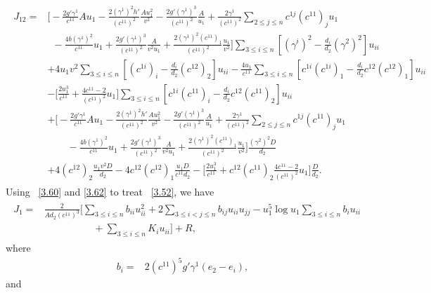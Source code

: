 \documentclass[11pt]{amsart}
\numberwithin{equation}{section}
\begin{document}
\begin{align}\label{3.62}
\begin{split}
J_{12}=&\big[-\frac{2g'\gamma^1}{c^{11}}Au_1-\frac{2(\gamma^1)^2h'}{(c^{11})^2}\frac{Au_1^2}{v^2}
-\frac{2g'(\gamma^1)^3}{(c^{11})^2}\frac{A}{u_1}
+\frac{2\gamma^1}{(c^{11})^2}\sum_{2\leq j\leq n}c^{1j}(c^{11})_ju_1\\&\,\,\,-\frac{4b(\gamma^1)^2}{c^{11}}u_1+\frac{2g'(\gamma^1)^3}{(c^{11})^2}\frac{A}{v^2u_1}
+\frac{2(\gamma^1)^2(c^{11})_1}{(c^{11})^2}\frac{u_1}{v^2}\big]\sum_{3\leq i\leq n}[(\gamma^i)^2-\frac{d_i}{d_2}(\gamma^2)^2]u_{ii}\\&+4u_1v^2\sum_{3\leq i\leq n}[(c^{1i})_{i}-\frac{d_i}{d_2}(c^{12})_{2}]u_{ii}-\frac{4u_1}{c^{11}}\sum_{3\leq i\leq n}[c^{1i}(c^{1i})_1-\frac{d_i}{d_2}c^{12}(c^{12})_1]u_{ii}\\&
-\big[\frac{2u_1^3}{c^{11}}+\frac{4c^{11}-2}{(c^{11})^2}u_1\big]\sum_{3\leq i\leq n}[c^{1i}(c^{11})_i-\frac{d_i}{d_2}c^{12}(c^{11})_2]u_{ii}\\
&+\big[-\frac{2g'\gamma^1}{c^{11}}Au_1-\frac{2(\gamma^1)^2h'}{(c^{11})^2}\frac{Au_1^2}{v^2}
-\frac{2g'(\gamma^1)^3}{(c^{11})^2}\frac{A}{u_1}
+\frac{2\gamma^1}{(c^{11})^2}\sum_{2\leq j\leq n}c^{1j}(c^{11})_ju_1\\&\qquad-\frac{4b(\gamma^1)^2}{c^{11}}u_1+\frac{2g'(\gamma^1)^3}{(c^{11})^2}\frac{A}{v^2u_1}
+\frac{2(\gamma^1)^2(c^{11})_1}{(c^{11})^2}\frac{u_1}{v^2}\big]\frac{(\gamma^2)^2D}{d_2}\\&
+4(c^{12})_{2}\frac{u_1v^2D}{d_2}-4c^{12}(c^{12})_1\frac{u_1D}{c^{11}d_2}-\big[\frac{2u_1^3}{c^{11}}
+c^{12}(c^{11})_2\frac{4c^{11}-2}{(c^{11})^2}u_1\big]\frac{D}{d_2}.
\end{split}
\end{align}
Using ~\eqref{3.60} and \eqref{3.62} to treat ~\eqref{3.52},  we have
\begin{align}\label{3.63}
\begin{split}
J_{1}=&\frac{2}{Ad_2(c^{11})^3}\big[\sum_{3\leq i\leq n}b_{ii}u_{ii}^2+2\sum_{3\leq i< j\leq n}b_{ij}u_{ii}u_{jj}-u_1^5\log u_1\sum_{3\leq i\leq n}b_iu_{ii}\\&\qquad\qquad\quad+\sum_{3\leq i\leq n}K_iu_{ii}\big]+ R,
\end{split}
\end{align}
where
\begin{align}\label{3.64}
b_i=&2(c^{11})^5g'\gamma^1(e_2-e_i),
\end{align}
 and
\end{document}
